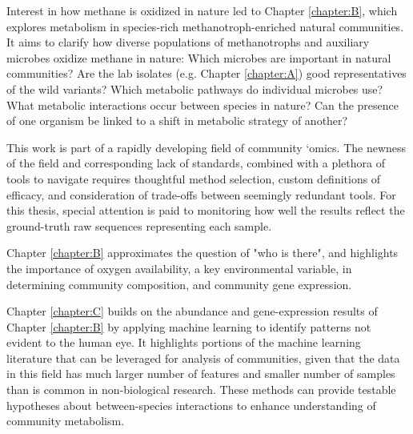 Interest in how methane is oxidized in nature led to Chapter \ref{chapter:B}, which explores metabolism in species-rich methanotroph-enriched natural communities.
It aims to clarify how diverse populations of methanotrophs and auxiliary microbes oxidize methane in nature: %
Which microbes are important in natural communities?
Are the lab isolates (e.g. Chapter \ref{chapter:A}) good representatives of the wild variants?
Which metabolic pathways do individual microbes use?
What metabolic interactions occur between species in nature?
Can the presence of one organism be linked to a shift in metabolic strategy of another?

This work is part of a rapidly developing field of community `omics.
The newness of the field and corresponding lack of standards, combined with a plethora of tools to navigate requires thoughtful method selection, custom definitions of efficacy, and consideration of trade-offs between seemingly redundant tools.
For this thesis, special attention is paid to monitoring how well the results reflect the ground-truth raw sequences representing each sample.


Chapter \ref{chapter:B} approximates %
the question of "who is there", and highlights the importance of oxygen availability, a key environmental variable, in determining community composition, and community gene expression.

Chapter \ref{chapter:C} builds on the abundance and gene-expression results of Chapter \ref{chapter:B} by applying machine learning to identify patterns not evident to the human eye.
It highlights portions of the machine learning literature that can be leveraged for analysis of communities, given that the data in this field has much larger number of features and smaller number of samples than is common in non-biological research.
These methods can provide testable hypotheses about between-species interactions to enhance understanding of community metabolism.





